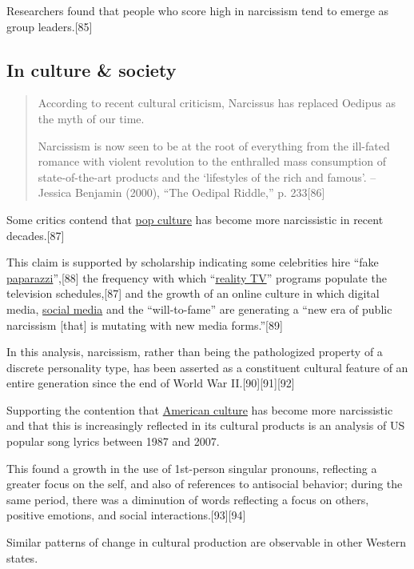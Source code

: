 \documentclass[oneside]{book}
\numberwithin{equation}{section}
\begin{document}
Researchers found that people who score high in narcissism tend to emerge as group leaders.[85]

\subsection{In culture \& society}
\begin{quotation}
    According to recent cultural criticism, Narcissus has replaced Oedipus as the myth of our time.
    
    Narcissism is now seen to be at the root of everything from the ill-fated romance with violent revolution to the enthralled mass consumption of state-of-the-art products and the `lifestyles of the rich and famous'. -- Jessica Benjamin (2000), ``The Oedipal Riddle,'' p. 233[86]
\end{quotation}
Some critics contend that \href{https://en.wikipedia.org/wiki/Popular_culture}{pop culture} has become more narcissistic in recent decades.[87]

This claim is supported by scholarship indicating some celebrities hire ``fake \href{https://en.wikipedia.org/wiki/Paparazzi}{paparazzi}'',[88] the frequency with which ``\href{https://en.wikipedia.org/wiki/Reality_TV}{reality TV}'' programs populate the television schedules,[87] and the growth of an online culture in which digital media, \href{https://en.wikipedia.org/wiki/Social_media}{social media} and the ``will-to-fame'' are generating a ``new era of public narcissism [that] is mutating with new media forms.''[89]

In this analysis, narcissism, rather than being the pathologized property of a discrete personality type, has been asserted as a constituent cultural feature of an entire generation since the end of World War II.[90][91][92]

%
Supporting the contention that \href{https://en.wikipedia.org/wiki/American_culture}{American culture} has become more narcissistic and that this is increasingly reflected in its cultural products is an analysis of US popular song lyrics between 1987 and 2007.

This found a growth in the use of 1st-person singular pronouns, reflecting a greater focus on the self, and also of references to antisocial behavior; during the same period, there was a diminution of words reflecting a focus on others, positive emotions, and social interactions.[93][94]

Similar patterns of change in cultural production are observable in other Western states.
\end{document}
